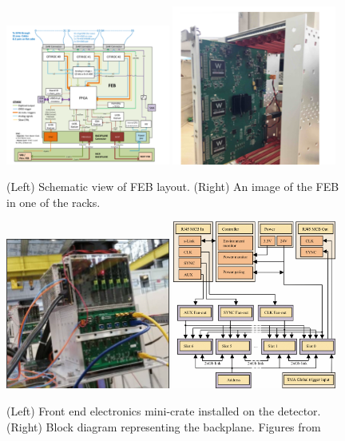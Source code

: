 \begin{figure}[h!]
	\centering
\includegraphics[width=0.48\textwidth]{figures/FEB.png}
\includegraphics[width=0.48\textwidth]{figures/FEB2.png}
\caption{(Left) Schematic view of FEB layout. (Right) An image of the FEB in one of the racks.}
\label{fig:FEB}
\end{figure}

\begin{figure}[h!]
\centering
\includegraphics[width=0.48\textwidth]{figures/crateInstalled.png}
\includegraphics[width=0.48\textwidth]{figures/backplane.png}
\caption{(Left) Front end electronics mini-crate installed on the detector. (Right) Block diagram representing the backplane. Figures from \cite{52Georgi}}
\label{fig:crate}
\end{figure}

